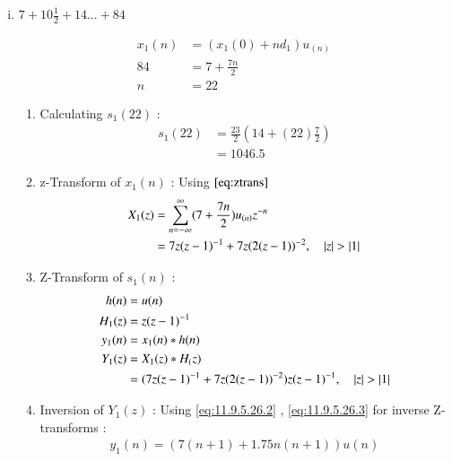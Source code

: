 \documentclass[journal,12pt,onecolumn]{IEEEtran}
\theoremstyle{remark}
\begin{document}
\begin{enumerate}[(i)]
\item
$ 7 + 10\frac{1}{2} + 14 ... + 84$
\vspace{0.5cm}

\begin{align}
x_1(n) &= (x_1(0) + nd_1)u_{(n)}\\
84 &= 7+\frac{7n}{2}\\
n &= 22
\end{align}

\begin{enumerate}[1.]
\item 
Calculating $s_1(22)$ : 
\begin{align}
    s_1{(22)} &= \frac{23}{2}(14+(22)\frac{7}{2})\\
     &= 1046.5
    \end{align}
    
\item 
z-Transform of $x_1(n)$ :
Using $\eqref{eq:ztrans}$
\begin{align}
X_1(z) &= \sum_{n=-\infty}^{\infty}(7 + \frac{7n}{2})u_{(n)}z^{-n} \\
&= 7z(z-1)^{-1} + 7z(2(z-1))^{-2}  \label{eq:ee25-4}
,\quad \left\vert z\right\vert>\left\vert1\right\vert 
\end{align}
\item
Z-Transform of $s_1(n)$ :
\begin{align}
         h(n) &= u(n) \\
                 H_1(z) &= z(z-1)^{-1} \label{eq:ee25-9}\\
    y_1(n) &= x_1(n) * h(n) \\
    Y_1(z) &= X_1(z) * H_(z)\\
 &= (7z(z-1)^{-1}+
7z(2(z-1))^{-2})z(z-1)^{-1}
,\quad \left\vert z\right\vert>\left\vert1\right\vert     
\end{align}
        \item
Inversion of $Y_1(z)$ :
Using \eqref{eq:11.9.5.26.2} , \eqref{eq:11.9.5.26.3} for inverse Z-transforms :
\begin{align}
 y_1(n) = (7(n+1) + 1.75n(n+1))u(n)
\end{align}
\end{enumerate}    


\end{enumerate}
\end{document}
